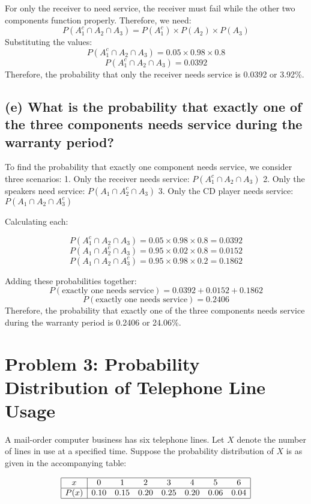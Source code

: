 \documentclass{article}
\begin{document}
For only the receiver to need service, the receiver must fail while the other two components function properly. Therefore, we need:
\[
P(A_1^c \cap A_2 \cap A_3) = P(A_1^c) \times P(A_2) \times P(A_3)
\]
Substituting the values:
\[
P(A_1^c \cap A_2 \cap A_3) = 0.05 \times 0.98 \times 0.8
\]
\[
P(A_1^c \cap A_2 \cap A_3) = 0.0392
\]
Therefore, the probability that only the receiver needs service is 0.0392 or 3.92\%.

\subsection*{(e) What is the probability that exactly one of the three components needs service during the warranty period?}

To find the probability that exactly one component needs service, we consider three scenarios:
1. Only the receiver needs service: \(P(A_1^c \cap A_2 \cap A_3)\)
2. Only the speakers need service: \(P(A_1 \cap A_2^c \cap A_3)\)
3. Only the CD player needs service: \(P(A_1 \cap A_2 \cap A_3^c)\)

Calculating each:

\[
P(A_1^c \cap A_2 \cap A_3) = 0.05 \times 0.98 \times 0.8 = 0.0392
\]
\[
P(A_1 \cap A_2^c \cap A_3) = 0.95 \times 0.02 \times 0.8 = 0.0152
\]
\[
P(A_1 \cap A_2 \cap A_3^c) = 0.95 \times 0.98 \times 0.2 = 0.1862
\]

Adding these probabilities together:
\[
P(\text{exactly one needs service}) = 0.0392 + 0.0152 + 0.1862
\]
\[
P(\text{exactly one needs service}) = 0.2406
\]
Therefore, the probability that exactly one of the three components needs service during the warranty period is 0.2406 or 24.06\%.

\section*{Problem 3: Probability Distribution of Telephone Line Usage}

A mail-order computer business has six telephone lines. Let \(X\) denote the number of lines in use at a specified time. Suppose the probability distribution of \(X\) is as given in the accompanying table:

\[
\begin{array}{|c|ccccccc|}
\hline
x & 0 & 1 & 2 & 3 & 4 & 5 & 6 \\
\hline
P(x) & 0.10 & 0.15 & 0.20 & 0.25 & 0.20 & 0.06 & 0.04 \\
\hline
\end{array}
\]
\end{document}
